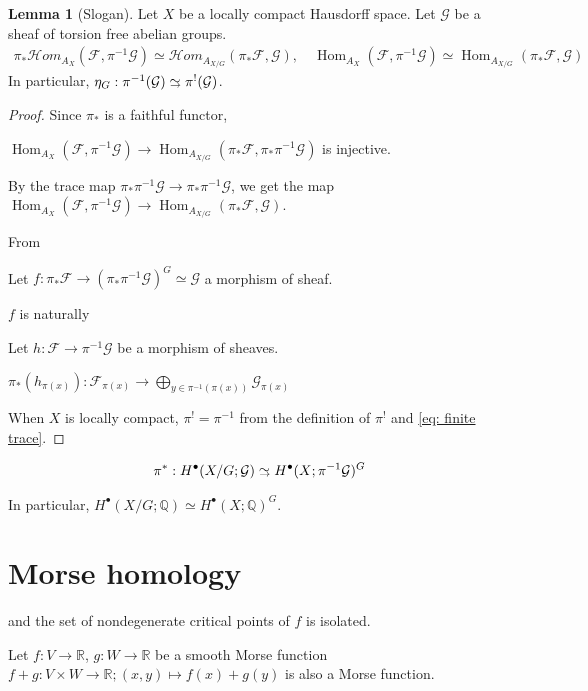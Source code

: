 \documentclass[a4paper,dvipdfmx,reqno,12pt]{amsart}
\theoremstyle{definition}
\newtheorem{Lem}[Thm]{Lemma}
\newcommand{\R}{\mathbb{R}}%
\newcommand{\Q}{\mathbb{Q}}%
\newcommand{\mcal}[1]{\mathcal{#1}}%
\newcommand{\opn}[1]{\operatorname{#1}}
\newcommand{\simto}{ 
\mathrel{\raisebox{0.13em}{${\sim}$}}
\kern -0.75em \mathrel{\raisebox{-0.11em}{${\scriptstyle \to}$}}  
}
\numberwithin{equation}{section}
\begin{document}
\begin{Lem}[Slogan]
  Let $X$ be a locally compact Hausdorff space. Let $\mcal{G}$ be a sheaf of
  torsion free abelian groups.
  \begin{align} \label{eq: finite trace}
    \pi_*\mcal{H}om_{A_{X}}(\mcal{F},\pi^{-1}\mcal{G})\simeq
    \mcal{H}om_{A_{X/G}}(\pi_*\mcal{F},\mcal{G}), \quad
    \opn{Hom}_{A_{X}}(\mcal{F},\pi^{-1}\mcal{G})\simeq
    \opn{Hom}_{A_{X/G}}(\pi_*\mcal{F},\mcal{G})
  \end{align}
  In particular, $\eta_{G}:\pi^{-1}(\mcal{G})\simto \pi^{!}(\mcal{G})$.
\end{Lem}
\begin{proof}
  Since $\pi_*$ is a faithful functor,

  $\opn{Hom}_{A_{X}}(\mcal{F},\pi^{-1}\mcal{G})
    \to \opn{Hom}_{A_{X/G}}(\pi_*\mcal{F},\pi_*\pi^{-1}\mcal{G})$
  is injective.

  By the trace map $\pi_*\pi^{-1}\mcal{G}\to \pi_*\pi^{-1}\mcal{G}$,
  we get the map
  $\opn{Hom}_{A_{X}}(\mcal{F},\pi^{-1}\mcal{G})
    \to \opn{Hom}_{A_{X/G}}(\pi_*\mcal{F},\mcal{G})$.

  From

  Let $f:\pi_*\mcal{F}\to (\pi_*\pi^{-1}\mcal{G})^{G}\simeq \mcal{G}$ a morphism of sheaf.

  $f$ is naturally

  Let $h:\mcal{F}\to \pi^{-1}\mcal{G}$ be a morphism of sheaves.

  $\pi_*(h_{\pi(x)}): \mcal{F}_{\pi(x)}\to \bigoplus_{y\in \pi^{-1}(\pi(x))}\mcal{G}_{\pi(x)}$

  When $X$ is locally compact,
  $\pi^{!}=\pi^{-1}$ from the definition of $\pi^{!}$ and \cref{eq: finite trace}.
\end{proof}
\cite[Theorem 19.2]{bredonSheafTheory1997a}
\begin{align}
  \pi^{*}: H^{\bullet}(X/G;\mcal{G})\simto  H^{\bullet}(X;\pi^{-1}\mcal{G})^{G}
\end{align}

In particular, $H^{\bullet}(X/G;\Q)\simeq H^{\bullet}(X;\Q)^{G}$.


\section{Morse homology} \label{sec: Morse}

and the set of nondegenerate critical points of $f$ is isolated\cite[Corollary 1.3.2]{}.

Let $f:V \to \R$, $g:W \to \R$ be a smooth Morse function $f+g:V\times W\to \R;(x,y)\mapsto f(x)+g(y)$ is also a Morse function.
\end{document}

